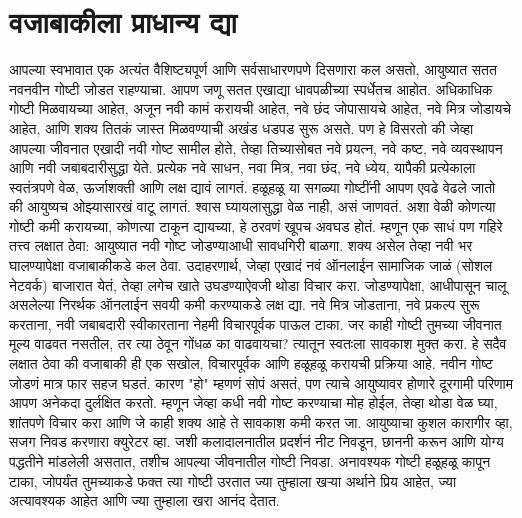  \chapter{वजाबाकीला प्राधान्य द्या}
आपल्या स्वभावात एक अत्यंत वैशिष्ट्यपूर्ण आणि सर्वसाधारणपणे दिसणारा कल असतो, आयुष्यात सतत नवनवीन गोष्टी जोडत राहण्याचा.
 आपण जणू सतत एखाद्या धावपळीच्या स्पर्धेतच आहोत. अधिकाधिक गोष्टी मिळवायच्या आहेत, अजून नवी कामं करायची आहेत, नवे छंद जोपासायचे आहेत, नवे मित्र जोडायचे आहेत, आणि शक्य तितकं जास्त मिळवण्याची अखंड धडपड सुरू असते.
पण हे विसरतो की जेव्हा आपल्या जीवनात एखादी नवी गोष्ट सामील होते, तेव्हा तिच्यासोबत नवे प्रयत्न, नवे कष्ट, नवे व्यवस्थापन आणि नवी जबाबदारीसुद्धा येते.
 प्रत्येक नवे साधन, नवा मित्र, नवा छंद, नवे ध्येय, यापैकी प्रत्येकाला स्वतंत्रपणे वेळ, ऊर्जाशक्ती आणि लक्ष द्यावं लागतं. हळूहळू या सगळ्या गोष्टींनी आपण एवढे वेढले जातो की आयुष्यच ओझ्यासारखं वाटू लागतं.
 श्वास घ्यायलासुद्धा वेळ नाही, असं जाणवतं. अशा वेळी कोणत्या गोष्टी कमी करायच्या, कोणत्या टाकून द्यायच्या, हे ठरवणं खूपच अवघड होतं.
म्हणून एक साधं पण गहिरे तत्त्व लक्षात ठेवा: आयुष्यात नवी गोष्ट जोडण्याआधी सावधगिरी बाळगा. शक्य असेल तेव्हा नवी भर घालण्यापेक्षा वजाबाकीकडे कल ठेवा.
उदाहरणार्थ, जेव्हा एखादं नवं ऑनलाईन सामाजिक जाळं (सोशल नेटवर्क) बाजारात येतं, तेव्हा लगेच खाते उघडण्याऐवजी थोडा विचार करा.
 जोडण्यापेक्षा, आधीपासून चालू असलेल्या निरर्थक ऑनलाईन सवयी कमी करण्याकडे लक्ष द्या.
नवे मित्र जोडताना, नवे प्रकल्प सुरू करताना, नवी जबाबदारी स्वीकारताना नेहमी विचारपूर्वक पाऊल टाका.
 जर काही गोष्टी तुमच्या जीवनात मूल्य वाढवत नसतील, तर त्या ठेवून गोंधळ का वाढवायचा? त्यातून स्वतःला सावकाश मुक्त करा.
हे सदैव लक्षात ठेवा की वजाबाकी ही एक सखोल, विचारपूर्वक आणि हळूहळू करायची प्रक्रिया आहे.
 नवीन गोष्ट जोडणं मात्र फार सहज घडतं. कारण "हो" म्हणणं सोपं असतं, पण त्याचे आयुष्यावर होणारे दूरगामी परिणाम आपण अनेकदा दुर्लक्षित करतो.
 म्हणून जेव्हा कधी नवी गोष्ट करण्याचा मोह होईल, तेव्हा थोडा वेळ घ्या, शांतपणे विचार करा आणि जे काही शक्य आहे ते सावकाश कमी करत जा.
आयुष्याचा कुशल कारागीर व्हा, सजग निवड करणारा क्युरेटर व्हा.
 जशी कलादालनातील प्रदर्शनं नीट निवडून, छाननी करून आणि योग्य पद्धतीने मांडलेली असतात, तशीच आपल्या जीवनातील गोष्टी निवडा.
 अनावश्यक गोष्टी हळूहळू कापून टाका, जोपर्यंत तुमच्याकडे फक्त त्या गोष्टी उरतात ज्या तुम्हाला खऱ्या अर्थाने प्रिय आहेत, ज्या अत्यावश्यक आहेत आणि ज्या तुम्हाला खरा आनंद देतात.

